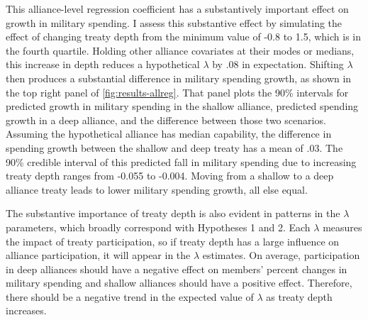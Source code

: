 \documentclass[12pt]{article}
\begin{document}
This alliance-level regression coefficient has a substantively important effect on growth in military spending. 
I assess this substantive effect by simulating the effect of changing treaty depth from the minimum value of -0.8 to 1.5, which is in the fourth quartile. 
Holding other alliance covariates at their modes or medians, this increase in depth reduces a hypothetical $\lambda$ by .08 in expectation.
Shifting $\lambda$ then produces a substantial difference in military spending growth, as shown in the top right panel of \autoref{fig:results-allreg}.
That panel plots the 90\% intervals for predicted growth in military spending in the shallow alliance, predicted spending growth in a deep alliance, and the difference between those two scenarios.
Assuming the hypothetical alliance has median capability, the difference in spending growth between the shallow and deep treaty has a mean of .03.
The 90\% credible interval of this predicted fall in military spending due to increasing treaty depth ranges from -0.055 to -0.004.
Moving from a shallow to a deep alliance treaty leads to lower military spending growth, all else equal.  


The substantive importance of treaty depth is also evident in patterns in the $\lambda$ parameters, which broadly correspond with Hypotheses 1 and 2. 
Each $\lambda$ measures the impact of treaty participation, so if treaty depth has a large influence on alliance participation, it will appear in the $\lambda$ estimates. 
On average, participation in deep alliances should have a negative effect on members' percent changes in military spending and shallow alliances should have a positive effect.
Therefore, there should be a negative trend in the expected value of $\lambda$ as treaty depth increases.
\end{document}
